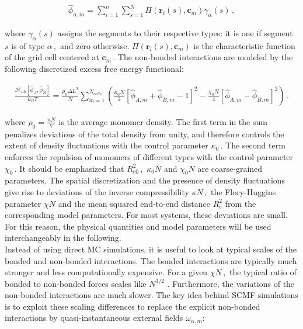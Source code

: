\documentclass[bachelor,       %
               oneside,        %
               BCOR10mm,       %
               ngerman, english %
               ]{GAUBM}
\begin{document}
\begin{align}
    \hat\phi_{\alpha,m}=\sum_{i=1}^n\sum_{s=1}^N\Pi(\mathbf r_i(s),\mathbf c_m)\gamma_\alpha(s)\,,
    \label{eq:normalized_densities}
\end{align}

where $\gamma_\alpha(s)$ assigns the segments to their respective types: it is one if segment $s$ is of type $\alpha\,,$ and zero otherwise. $\Pi(\mathbf r_i(s),\mathbf c_m)$ is the characteristic function of the grid cell centered at $\mathbf c_m\,.$ The non-bonded interactions are modeled by the following discretized excess free energy functional:

\begin{align}
    \frac{\mathcal H_\text{nb}[\hat\phi_A,\hat\phi_B]}{k_BT}=\frac{\rho_0\Delta L^3}{N}\sum_{m=1}^{N_{cells}}\left(\frac{\kappa_0 N}{2}[\hat\phi_{A,m}+\hat\phi_{B,m}-1]^2-\frac{\chi_0 N}{4}[\hat\phi_{A,m}-\hat\phi_{B,m}]^2\right)\,.
    \label{eq:nonbonded_discretized}
\end{align}

where $\rho_0=\frac{nN}{V}$ is the average monomer density. The first term in the sum penalizes deviations of the total density from unity, and therefore controls the extent of density fluctuations with the control parameter $\kappa_0\,.$ The second term enforces the repulsion of monomers of different types with the control parameter $\chi_0\,.$ It should be emphasized that $R_{e0}^2\,,$ $\kappa_0N$ and $\chi_0N$ are coarse-grained parameters. The spatial discretization and the presence of density fluctuations give rise to deviations of the inverse compressibility $\kappa N\,,$ the Flory-Huggins parameter $\chi N$ and the mean squared end-to-end distance $R_e^2$ from the corresponding model parameters. For most systems, these deviations are small. For this reason, the physical quantities and model parameters will be used interchangeably in the following. \\
Instead of using direct \ac{MC} simulations, it is useful to look at typical scales of the bonded and non-bonded interactions. The bonded interactions are typically much stronger and less computationally expensive. For a given $\chi N\,,$ the typical ratio of bonded to non-bonded forces scales like $N^{3/2}$ \cite{Mueller_daoulas11}. Furthermore, the variations of the non-bonded interactions are much slower. The key idea behind \ac{SCMF} simulations is to exploit these scaling differences to replace the explicit non-bonded interactions by quasi-instantaneous external fields $\omega_{\alpha,m}$:
\end{document}
